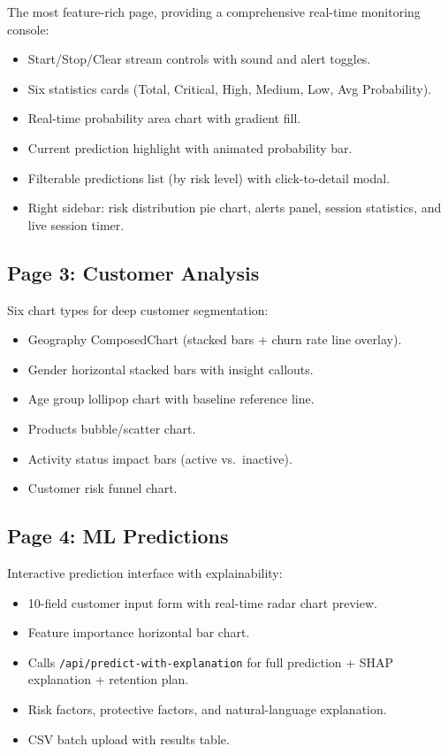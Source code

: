 \documentclass[12pt, a4paper]{report}
\begin{document}
The most feature-rich page, providing a comprehensive real-time monitoring console:
\begin{itemize}
    \item Start/Stop/Clear stream controls with sound and alert toggles.
    \item Six statistics cards (Total, Critical, High, Medium, Low, Avg Probability).
    \item Real-time probability area chart with gradient fill.
    \item Current prediction highlight with animated probability bar.
    \item Filterable predictions list (by risk level) with click-to-detail modal.
    \item Right sidebar: risk distribution pie chart, alerts panel, session statistics, and live session timer.
\end{itemize}

\subsection{Page 3: Customer Analysis}

Six chart types for deep customer segmentation:
\begin{itemize}
    \item Geography ComposedChart (stacked bars + churn rate line overlay).
    \item Gender horizontal stacked bars with insight callouts.
    \item Age group lollipop chart with baseline reference line.
    \item Products bubble/scatter chart.
    \item Activity status impact bars (active vs.\ inactive).
    \item Customer risk funnel chart.
\end{itemize}

\subsection{Page 4: ML Predictions}

Interactive prediction interface with explainability:
\begin{itemize}
    \item 10-field customer input form with real-time radar chart preview.
    \item Feature importance horizontal bar chart.
    \item Calls \texttt{/api/predict-with-explanation} for full prediction + SHAP explanation + retention plan.
    \item Risk factors, protective factors, and natural-language explanation.
    \item CSV batch upload with results table.
\end{itemize}
\end{document}
